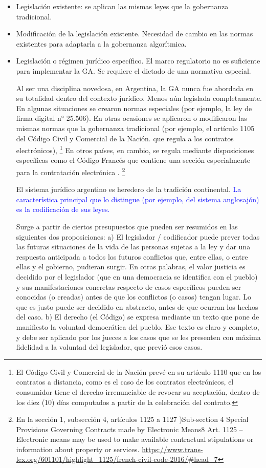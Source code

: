 \documentclass[12pt]{report} %
\begin{document}
\begin{itemize}
    \item Legislación existente: se aplican las mismas leyes que la gobernanza tradicional.
    \item Modificación de la legislación existente. Necesidad de cambio en las normas existentes para adaptarla a la gobernanza algorítmica.
    \item Legislación o régimen jurídico específico. El marco regulatorio no es suficiente para implementar la GA. Se requiere el dictado de una normativa especial. 


Al ser una disciplina novedosa, en Argentina, la GA nunca fue abordada en su totalidad dentro del contexto jurídico. Menos aún legislada completamente. En algunas situaciones se crearon normas especiales (por ejemplo, la ley de firma digital n° 25.506). En otras ocasiones se aplicaron o modificaron las mismas normas que la gobernanza tradicional (por ejemplo, el artículo 1105 del Código Civil y Comercial de la Nación. que regula a los contratos electrónicos), \footnote{El Código Civil y Comercial de la Nación prevé en su artículo 1110 que en los contratos a distancia, como es el caso de los contratos electrónicos, el consumidor tiene el derecho irrenunciable de revocar su aceptación, dentro de los diez (10) días computados a partir de la celebración del contrato.} En otros países, en cambio, se regula mediante disposiciones específicas como el Código Francés que contiene una sección especialmente para la contratación electrónica . \footnote{En la sección 1, subsección 4, artículos 1125 a 1127 )Sub-section 4 Special Provisions Governing Contracts made by Electronic Means8 Art. 1125 –Electronic means may be used to make available contractual stipulations or information about property or services.  \url{https://www.trans-lex.org/601101/highlight_1125/french-civil-code-2016/\#head_7}}


El sistema jurídico argentino es heredero de la tradición continental. \textcolor{blue}{La característica principal que lo distingue (por ejemplo, del sistema anglosajón) es la codificación de sus leyes.}


Surge a partir de ciertos presupuestos que pueden ser resumidos en las siguientes dos proposiciones: a) El legislador / codificador puede prever todas las futuras situaciones de la vida de las personas sujetas a la ley y dar una respuesta anticipada a todos los futuros conflictos que, entre ellas, o entre ellas y el gobierno, pudieran surgir. En otras palabras, el valor justicia es decidido por el legislador (que en una democracia se identifica con el pueblo) y sus manifestaciones concretas respecto de casos específicos pueden ser conocidas (o creadas) antes de que los conflictos (o casos) tengan lugar. Lo que es justo puede ser decidido en abstracto, antes de que ocurran los hechos del caso. b) El derecho (el Código) se expresa mediante un texto que pone de manifiesto la voluntad democrática del pueblo. Ese texto es claro y completo, y debe ser aplicado por los jueces a los casos que se les presenten con máxima fidelidad a la voluntad del legislador, que previó esos casos. 


\end{itemize}
\end{document}
